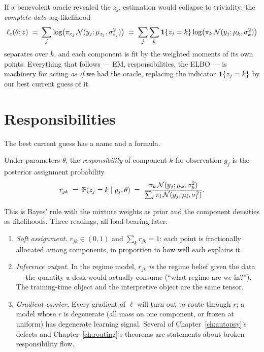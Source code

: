 If a benevolent oracle revealed the $z_j$, estimation would collapse to
triviality: the \emph{complete-data} log-likelihood
\begin{equation}\label{eq:complete}
  \ell_c(\theta; z) \;=\; \sum_{j} \log\bigl(\pi_{z_j}\,
  \mathcal{N}(y_j; \mu_{z_j}, \sigma_{z_j}^2)\bigr)
  \;=\; \sum_{j}\sum_{k} \mathbf{1}\{z_j = k\}
  \log\bigl(\pi_k\, \mathcal{N}(y_j; \mu_k, \sigma_k^2)\bigr)
\end{equation}
separates over $k$, and each component is fit by the weighted moments of
its own points. Everything that follows --- EM, responsibilities, the ELBO
--- is machinery for acting \emph{as if} we had the oracle, replacing the
indicator $\mathbf{1}\{z_j = k\}$ by our best current guess of it.

\section{Responsibilities}\label{sec:responsibilities}

The best current guess has a name and a formula.

\begin{definition}[Responsibility]\label{def:resp}
Under parameters $\theta$, the \emph{responsibility} of component $k$ for
observation $y_j$ is the posterior assignment probability
\begin{equation}\label{eq:resp}
  r_{jk} \;=\; \mathbb{P}(z_j = k \mid y_j, \theta)
  \;=\; \frac{\pi_k\, \mathcal{N}(y_j; \mu_k, \sigma_k^2)}
             {\sum_{l} \pi_l\, \mathcal{N}(y_j; \mu_l, \sigma_l^2)}.
\end{equation}
\end{definition}

This is Bayes' rule with the mixture weights as prior and the component
densities as likelihoods. Three readings, all load-bearing later:

\begin{enumerate}[leftmargin=1.6em, itemsep=1pt]
\item \emph{Soft assignment.} $r_{jk} \in (0,1)$ and $\sum_k r_{jk} = 1$:
  each point is fractionally allocated among components, in proportion to
  how well each explains it.
\item \emph{Inference output.} In the regime model, $r_{jk}$ \emph{is} the
  regime belief given the data --- the quantity a desk would actually
  consume (``what regime are we in?''). The training-time object and the
  interpretive object are the same tensor.
\item \emph{Gradient carrier.} Every gradient of $\ell$ will turn out to
  route through $r$; a model whose $r$ is degenerate (all mass on one
  component, or frozen at uniform) has degenerate learning signal. Several
  of Chapter~\ref{ch:autopsy}'s defects and Chapter~\ref{ch:routing}'s
  theorems are statements about broken responsibility flow.
\end{enumerate}

